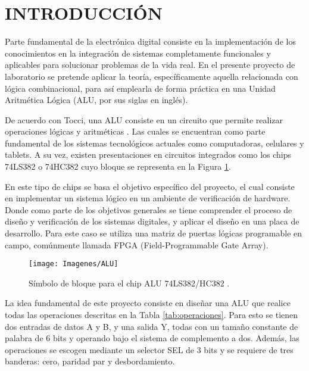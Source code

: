 \documentclass[journal,trans]{IEEEtran}
\begin{document}
\maketitle
\IEEEdisplaynontitleabstractindextext
\IEEEpeerreviewmaketitle

\section{INTRODUCCIÓN}

Parte fundamental de la electrónica digital consiste en la implementación de los conocimientos en la integración de sistemas completamente funcionales y aplicables para solucionar problemas de la vida real. En el presente proyecto de laboratorio se pretende aplicar la teoría, específicamente aquella relacionada con lógica combinacional, para así emplearla de forma práctica en una Unidad Aritmética Lógica (ALU, por sus siglas en inglés). 

De acuerdo con Tocci, una ALU consiste en un circuito que permite realizar operaciones lógicas y aritméticas \cite{Tocci}. Las cuales se encuentran como parte fundamental de los sistemas tecnológicos actuales como computadoras, celulares y tablets. A su vez, existen presentaciones en circuitos integrados como los chips 74LS382 o 74HC382 cuyo bloque se representa en la Figura \ref{fig:ALU}. 

En este tipo de chips se basa el objetivo específico del proyecto, el cual consiste en implementar un sistema lógico en un ambiente de verificación de hardware. Donde como parte de los objetivos generales se tiene comprender el proceso de diseño y verificación de los sistemas digitales, y aplicar el diseño en una placa de desarrollo. Para este caso se utiliza una matriz de puertas lógicas programable en campo, comúnmente llamada FPGA (Field-Programmable Gate Array).

\begin{figure}[!h]
	\centering
	\texttt{[image: Imagenes/ALU]}
	\caption{Símbolo de bloque para el chip ALU 74LS382/HC382 \cite{Tocci}.}
	\label{fig:ALU}
\end{figure}

La idea fundamental de este proyecto consiste en diseñar una ALU que realice todas las operaciones descritas en la Tabla \ref{tab:operaciones}. Para esto se tienen dos entradas de datos A y B, y una salida Y, todas con un tamaño constante de palabra de 6 bits y operando bajo el sistema de complemento a dos. Además, las operaciones se escogen mediante un selector SEL de 3 bits y se requiere de tres banderas: cero, paridad par y desbordamiento. 
\end{document}
